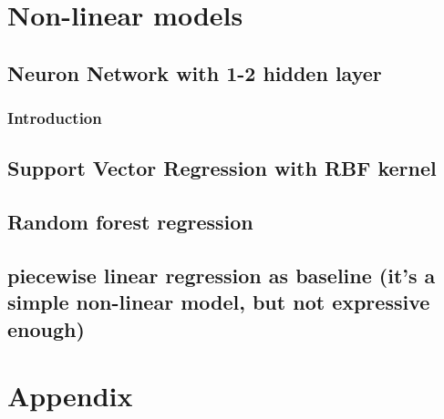 \documentclass[12pt]{article}
\begin{document}
\section{Non-linear models}
\subsection{Neuron Network with 1-2 hidden layer}
\subsubsection{Introduction}
\subsection{Support Vector Regression with RBF kernel}
\subsection{Random forest regression~\cite{randomForestWiki2016}}
\subsection{piecewise linear regression as baseline (it's a simple non-linear model, but not expressive enough)}
\section{Appendix}
\end{document}
